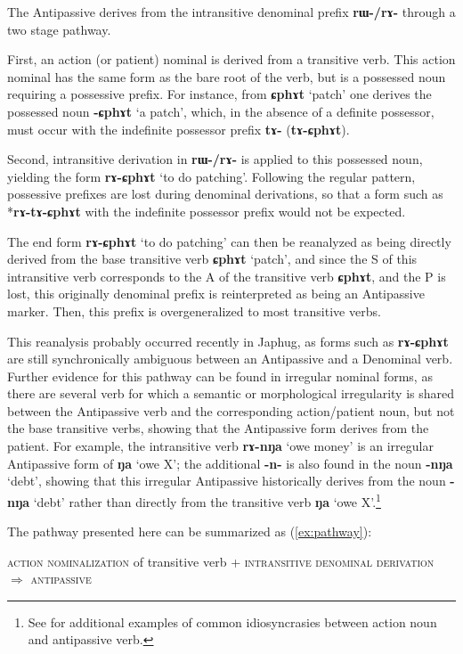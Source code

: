 \documentclass[oldfontcommands,oneside,a4paper,11pt]{article}
\newcommand{\ipa}[1]{\mbox{\phon\textbf{#1}}} %
\begin{document}
The Antipassive derives from the intransitive denominal prefix \ipa{rɯ-/rɤ-} through a two stage pathway.

First, an action (or patient) nominal is derived from a transitive verb. This action nominal has the same form as the bare root of the verb, but is a possessed noun requiring a possessive prefix. For instance, from \ipa{ɕphɤt} `patch' one derives the possessed noun 
\ipa{-ɕphɤt} `a patch', which, in the absence of a definite possessor, must occur with the indefinite possessor prefix \ipa{tɤ-} (\ipa{tɤ-ɕphɤt}).

Second, intransitive derivation in \ipa{rɯ-/rɤ-} is applied to this possessed noun, yielding the form \ipa{rɤ-ɕphɤt} `to do patching'. Following the regular pattern, possessive prefixes are lost during denominal derivations, so that a form such as *\ipa{rɤ-tɤ-ɕphɤt} with the indefinite possessor prefix would not be expected.

The end form \ipa{rɤ-ɕphɤt} `to do patching' can then be reanalyzed as being directly derived from the base transitive verb \ipa{ɕphɤt} `patch', and since the S of this intransitive verb corresponds to the A of the transitive verb \ipa{ɕphɤt}, and the P is lost, this originally denominal prefix is reinterpreted as being an Antipassive marker. Then, this prefix is overgeneralized to most transitive verbs.

This reanalysis probably occurred recently in Japhug, as forms such as \ipa{rɤ-ɕphɤt} are still synchronically ambiguous between an Antipassive and a Denominal verb. Further evidence for this pathway can be found in irregular nominal forms, as there are several verb for which a semantic or morphological irregularity is shared between the Antipassive verb and the corresponding action/patient noun, but not the base transitive verbs, showing that the Antipassive form derives from the patient. For example, the intransitive verb \ipa{rɤ-nŋa} `owe money' is an irregular Antipassive form of \ipa{ŋa} `owe X'; the additional \ipa{-n-} is also found in the noun \ipa{-nŋa} `debt', showing that this irregular Antipassive historically derives from the noun \ipa{-nŋa} `debt' rather than directly from the transitive verb \ipa{ŋa} `owe X'.\footnote{See \citet{jacques14antipassive} for additional examples of common idiosyncrasies between action noun and antipassive verb.}

The pathway presented here can be summarized as (\ref{ex:pathway}):

\begin{exe}
\ex \label{ex:pathway}
\glt \textsc{action nominalization} of transitive verb + \textsc{intransitive denominal derivation} $\Rightarrow$ \textsc{antipassive}
\end{exe}
\end{document}
